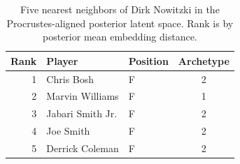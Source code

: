 \begin{table}[htbp]
  \centering\small
  \begin{tabular}{rllc}
    \toprule
    Rank & Player & Position & Archetype \\
    \midrule
    1 & Chris Bosh & F & 2 \\
    2 & Marvin Williams & F & 1 \\
    3 & Jabari Smith Jr. & F & 2 \\
    4 & Joe Smith & F & 2 \\
    5 & Derrick Coleman & F & 2 \\
    \bottomrule
  \end{tabular}
  \caption{Five nearest neighbors of Dirk Nowitzki in the Procrustes-aligned posterior latent space. Rank is by posterior mean embedding distance.}
  \label{tab:Dirk_Nowitzki_neighbors}
\end{table}

